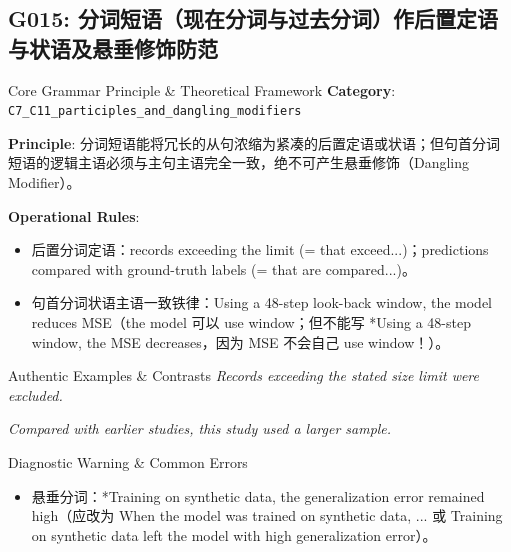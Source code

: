\subsection{G015: 分词短语（现在分词与过去分词）作后置定语与状语及悬垂修饰防范}\label{sec:rule:G015}
\begin{ConceptBox}{Core Grammar Principle \& Theoretical Framework}
\textbf{Category}: \texttt{C7\_C11\_participles\_and\_dangling\_modifiers}\par\vspace{3pt}
\textbf{Principle}: 分词短语能将冗长的从句浓缩为紧凑的后置定语或状语；但句首分词短语的逻辑主语必须与主句主语完全一致，绝不可产生悬垂修饰（Dangling Modifier）。\par\vspace{4pt}
\textbf{Operational Rules}:
\begin{itemize}[leftmargin=1.5em, itemsep=1pt]
  \item 后置分词定语：records exceeding the limit (= that exceed...)；predictions compared with ground-truth labels (= that are compared...)。
  \item 句首分词状语主语一致铁律：Using a 48-step look-back window, the model reduces MSE（the model 可以 use window；但不能写 *Using a 48-step window, the MSE decreases，因为 MSE 不会自己 use window！）。
\end{itemize}
\end{ConceptBox}
\begin{ExampleBox}{Authentic Examples \& Contrasts}
\textit{Records exceeding the stated size limit were excluded.}\par\vspace{2pt}
\textit{Compared with earlier studies, this study used a larger sample.}\par\vspace{2pt}
\end{ExampleBox}
\begin{TipBox}{Diagnostic Warning \& Common Errors}
\begin{itemize}[leftmargin=1.5em, itemsep=1pt]
  \item 悬垂分词：*Training on synthetic data, the generalization error remained high（应改为 When the model was trained on synthetic data, ... 或 Training on synthetic data left the model with high generalization error）。
\end{itemize}
\end{TipBox}
\vspace{6pt}
